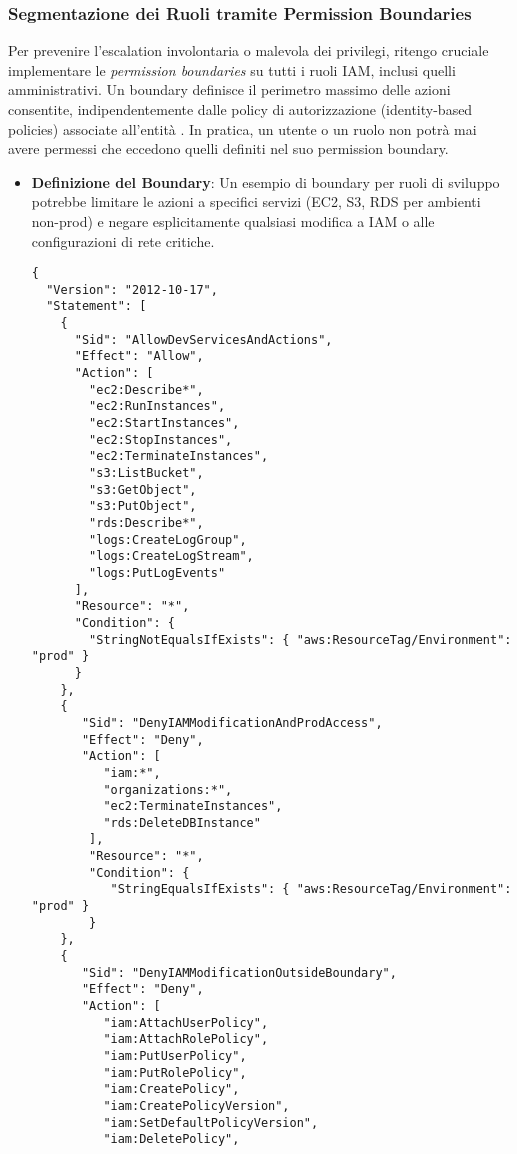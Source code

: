\subsubsection{Segmentazione dei Ruoli tramite Permission Boundaries}
Per prevenire l'escalation involontaria o malevola dei privilegi, ritengo cruciale implementare le \emph{permission boundaries} su tutti i ruoli IAM, inclusi quelli amministrativi. Un boundary definisce il perimetro massimo delle azioni consentite, indipendentemente dalle policy di autorizzazione (identity-based policies) associate all'entità \cite{aws:iam:boundaries}. In pratica, un utente o un ruolo non potrà mai avere permessi che eccedono quelli definiti nel suo permission boundary.
\begin{itemize}
    \item \textbf{Definizione del Boundary}: Un esempio di boundary per ruoli di sviluppo potrebbe limitare le azioni a specifici servizi (EC2, S3, RDS per ambienti non-prod) e negare esplicitamente qualsiasi modifica a IAM o alle configurazioni di rete critiche.
    \begin{lstlisting}[style=json, caption={Esempio di Permission Boundary restrittiva per sviluppatori}, label=lst:permission-boundary-dev]
{
  "Version": "2012-10-17",
  "Statement": [
    {
      "Sid": "AllowDevServicesAndActions",
      "Effect": "Allow",
      "Action": [
        "ec2:Describe*",
        "ec2:RunInstances", 
        "ec2:StartInstances",
        "ec2:StopInstances",
        "ec2:TerminateInstances",
        "s3:ListBucket",
        "s3:GetObject",
        "s3:PutObject", 
        "rds:Describe*",
        "logs:CreateLogGroup",
        "logs:CreateLogStream",
        "logs:PutLogEvents"
      ],
      "Resource": "*",
      "Condition": {
        "StringNotEqualsIfExists": { "aws:ResourceTag/Environment": "prod" } 
      }
    },
    {
       "Sid": "DenyIAMModificationAndProdAccess",
       "Effect": "Deny",
       "Action": [
          "iam:*", 
          "organizations:*",
          "ec2:TerminateInstances", 
          "rds:DeleteDBInstance" 
        ],
        "Resource": "*",
        "Condition": {
           "StringEqualsIfExists": { "aws:ResourceTag/Environment": "prod" } 
        }
    },
    {
       "Sid": "DenyIAMModificationOutsideBoundary",
       "Effect": "Deny",
       "Action": [
          "iam:AttachUserPolicy",
          "iam:AttachRolePolicy",
          "iam:PutUserPolicy",
          "iam:PutRolePolicy",
          "iam:CreatePolicy",
          "iam:CreatePolicyVersion",
          "iam:SetDefaultPolicyVersion",
          "iam:DeletePolicy",

\end{lstlisting}
\end{itemize}
